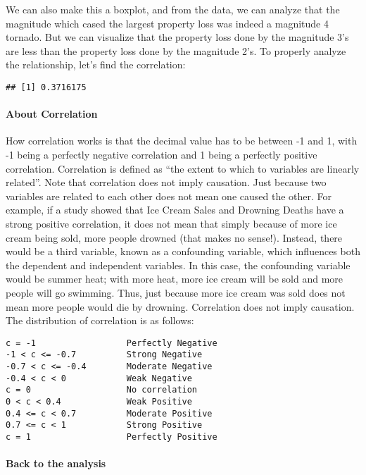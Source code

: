 \documentclass[
]{article}
\begin{document}
We can also make this a boxplot, and from the data, we can analyze that
the magnitude which cased the largest property loss was indeed a
magnitude 4 tornado. But we can visualize that the property loss done by
the magnitude 3's are less than the property loss done by the magnitude
2's. To properly analyze the relationship, let's find the correlation:

\begin{verbatim}
## [1] 0.3716175
\end{verbatim}

\paragraph{About Correlation}\label{about-correlation}

How correlation works is that the decimal value has to be between -1 and
1, with -1 being a perfectly negative correlation and 1 being a
perfectly positive correlation. Correlation is defined as ``the extent
to which to variables are linearly related''. Note that correlation does
not imply causation. Just because two variables are related to each
other does not mean one caused the other. For example, if a study showed
that Ice Cream Sales and Drowning Deaths have a strong positive
correlation, it does not mean that simply because of more ice cream
being sold, more people drowned (that makes no sense!). Instead, there
would be a third variable, known as a confounding variable, which
influences both the dependent and independent variables. In this case,
the confounding variable would be summer heat; with more heat, more ice
cream will be sold and more people will go swimming. Thus, just because
more ice cream was sold does not mean more people would die by drowning.
Correlation does not imply causation.\\
The distribution of correlation is as follows:

\begin{verbatim}
c = -1                  Perfectly Negative
-1 < c <= -0.7          Strong Negative
-0.7 < c <= -0.4        Moderate Negative
-0.4 < c < 0            Weak Negative
c = 0                   No correlation
0 < c < 0.4             Weak Positive
0.4 <= c < 0.7          Moderate Positive
0.7 <= c < 1            Strong Positive
c = 1                   Perfectly Positive
\end{verbatim}

\paragraph{Back to the analysis}\label{back-to-the-analysis}
\end{document}
